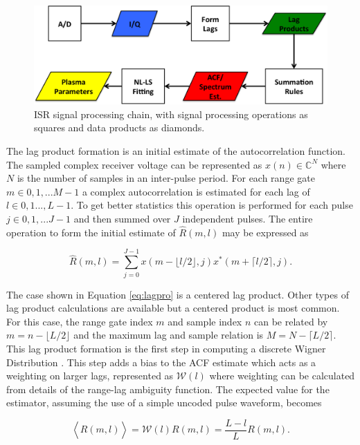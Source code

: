 \begin{figure}[!t]
\centering
\includegraphics[width=6in]{datastackchain}
\caption{ISR signal processing chain, with signal processing operations as squares and data products as diamonds.}
\label{fig:chain}
\end{figure}


The lag product formation is an initial estimate of the autocorrelation function. The sampled complex receiver voltage can be represented as $x(n) \in\mathbb{C}^N$ where $N$ is the number of samples in an inter-pulse period. For each range gate $m\in 0,1,...M-1$ a complex autocorrelation is estimated for each lag of $l \in 0,1...,L-1$.  To get better statistics this operation is performed for each pulse $j\in 0,1,...J-1$ and then summed over $J$ independent pulses. The entire operation to form the initial estimate of $\widehat{R}(m,l)$ may be expressed as

\begin{equation}
\label{eq:lagpro}
\widehat{R}(m,l) = \displaystyle\sum\limits_{j=0}^{J-1} x(m-\lfloor l/2\rfloor,j)x^*(m+\lceil l/2 \rceil,j).
\end{equation}

The case shown in Equation \ref{eq:lagpro} is a centered lag product.  Other types of lag product calculations are available but a centered product is most common. For this case, the range gate index $m$ and sample index $n$ can be related by $m=n-\lfloor L/2\rfloor$ and the maximum lag and sample relation is $M=N-\lceil L/2 \rceil$.  This lag product formation is the first step in computing a discrete Wigner Distribution \cite{TFAcohen}. This  step adds a bias to the ACF estimate which acts as a weighting on larger lags, represented as $\mathcal{W}(l)$ where weighting can be calculated from details of the range-lag ambiguity function. The expected value for the estimator, assuming the use of a simple uncoded pulse waveform, becomes

\begin{equation}
\label{eq:lagprobias}
\left\langle\widehat{R}(m,l) \right\rangle = \mathcal{W}(l)R(m,l) =\frac{L-l}{L}R(m,l).
\end{equation}

